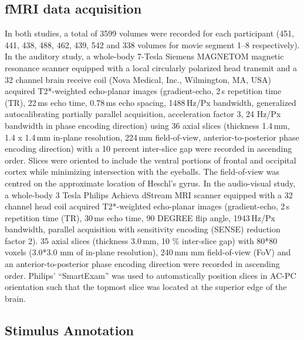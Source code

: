 \documentclass[english]{article}
\begin{document}
\subsection{fMRI data acquisition}
In both studies, a total of 3599 volumes were recorded for each participant (451, 441, 438, 488, 462, 439, 542 and 338 volumes for movie segment 1–8 respectively).
In the auditory study, a whole-body 7-Tesla Siemens MAGNETOM magnetic resonance scanner equipped with a local circularly polarized head transmit and a 32 channel brain receive coil (Nova Medical, Inc., Wilmington, MA, USA) acquired T2*-weighted echo-planar images (gradient-echo, 2\,s repetition time (TR), 22\,ms echo time, 0.78\,ms echo spacing, 1488\,Hz/Px bandwidth, generalized autocalibrating partially parallel acquisition, acceleration factor 3, 24 Hz/Px bandwidth in phase encoding direction)  using 36 axial slices (thickness 1.4\,mm, 1.4 x 1.4\,mm in-plane resolution, 224\,mm field-of-view, anterior-to-posterior phase encoding direction) with a 10 percent inter-slice gap were recorded in ascending order. Slices were oriented to include the ventral portions of frontal and occipital cortex while minimizing intersection with the eyeballs. The field-of-view was centred on the approximate location of Heschl's gyrus.
In the audio-visual study, a whole-body 3 Tesla Philips Achieva dStream MRI scanner equipped with a 32 channel head coil acquired T2*-weighted echo-planar images (gradient-echo, 2\,s repetition time (TR), 30\,ms echo time, 90 DEGREE flip angle, 1943\,Hz/Px bandwidth, parallel acquisition with sensitivity encoding (SENSE) reduction factor 2). 35 axial slices (thickness 3.0\,mm, 10 \% inter-slice gap) with 80*80 voxels (3.0*3.0 mm of in-plane resolution), 240\,mm mm field-of-view (FoV) and an anterior-to-posterior phase encoding direction were recorded in ascending order. Philips’ “SmartExam” was used to automatically position slices in AC-PC orientation such that the topmost slice was located at the superior edge of the brain.

\subsection{Stimulus Annotation}
\end{document}
